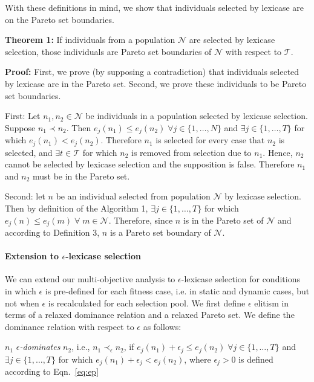 \documentclass[preprint]{article}
\begin{document}
With these definitions in mind, we show that individuals selected by lexicase are on the Pareto set boundaries. 

\medskip
\noindent \textbf{Theorem 1:} If individuals from a population $\mathcal{N}$ are selected by lexicase selection, those individuals are Pareto set boundaries of $\mathcal{N}$ with respect to $\mathcal{T}$. 
\medskip

\noindent \textbf{Proof:} First, we prove (by supposing a contradiction) that individuals selected by lexicase are in the Pareto set. Second, we prove these individuals to be Pareto set boundaries. 

First: Let $n_1, n_2 \in \mathcal{N}$ be individuals in a population selected by lexicase selection. Suppose $n_1 \prec n_2$. Then $e_j(n_1) \leq e_j(n_2) \;
\forall j  \in \{1,\dots,N\}$ and $\exists j \in \{1,\dots,T\}$ for which $e_j(n_1) < e_j(n_2)$. Therefore $n_1$ is selected for every case that $n_2$ is selected, and $\exists t \in \mathcal{T}$ for which $n_2$ is removed from selection due to $n_1$. Hence, $n_2$ cannot be selected by lexicase selection and the supposition is false. Therefore $n_1$ and $n_2$ must be in the Pareto set. 

Second: let $n$ be an individual selected from population  $\mathcal{N}$ by lexicase selection. Then by definition of the Algorithm 1, $\exists j \in \{1,\dots,T\}$ for which $e_j(n) \leq e_j(m) \; \forall \; m \in \mathcal{N}$. Therefore, since $n$ is in the Pareto set of $\mathcal{N}$ and according to Definition 3, $n$ is a Pareto set boundary of $\mathcal{N}$.  
\bigskip



\paragraph{Extension to $\epsilon$-lexicase selection}
We can extend our multi-objective analysis to $\epsilon$-lexicase selection for conditions in which $\epsilon$ is pre-defined for each fitness case, i.e. in static and dynamic cases, but not when $\epsilon$ is recalculated for each selection pool. We first define $\epsilon$ elitism in terms of a relaxed dominance relation and a relaxed Pareto set. We define the dominance relation with respect to $\epsilon$ as follows:


\medskip
{} $n_1$ {\it $\epsilon$-dominates} $n_2$, i.e., ${n_1} \prec_{\epsilon} {n_2}$, if $e_j(n_1) + \epsilon_j \leq e_j(n_2)  \;
\forall j  \in \{1,\dots,T\}$ and $\exists j \in \{1,\dots,T\}$ for which $e_j(n_1) + \epsilon_j < e_j(n_2) $, where $\epsilon_j>0$ is defined according to Eqn.~\ref{eq:ep}\bigskip
\bigskip
\medskip
\end{document}
